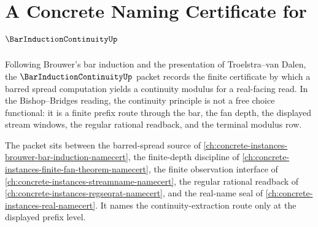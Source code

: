 \chapter{A Concrete Naming Certificate for $\BarInductionContinuityUp$}
\label{ch:concrete-instances-bar-induction-continuity-namecert}

Following Brouwer's bar induction and the presentation of Troelstra--van Dalen, the $\BarInductionContinuityUp$ packet records the finite certificate by which a barred spread computation yields a continuity modulus for a real-facing read. In the Bishop--Bridges reading, the continuity principle is not a free choice functional: it is a finite prefix route through the bar, the fan depth, the displayed stream windows, the regular rational readback, and the terminal modulus row.

The packet sits between the barred-spread source of \autoref{ch:concrete-instances-brouwer-bar-induction-namecert}, the finite-depth discipline of \autoref{ch:concrete-instances-finite-fan-theorem-namecert}, the finite observation interface of \autoref{ch:concrete-instances-streamname-namecert}, the regular rational readback of \autoref{ch:concrete-instances-regseqrat-namecert}, and the real-name seal of \autoref{ch:concrete-instances-real-namecert}. It names the continuity-extraction route only at the displayed prefix level.


